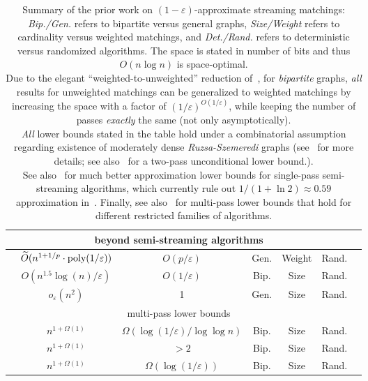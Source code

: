 \documentclass{article}
\newcommand{\Ot}{\widetilde{O}}
\newcommand{\eps}{\varepsilon}
\newcommand{\poly}{\mbox{\rm poly}}
\begin{document}
\begin{table}[h!]
{\begin{tabular}{|c | c | c | c | c | c | c |}
   \hline\hline
  \multicolumn{6}{|c|}{beyond semi-streaming algorithms} \\
  \hline\hline
  \cite{AhnG15} & $\Ot(n^{1+1/p} \cdot \poly{(1/\eps)})$ & $O(p/\eps)$ & Gen. & Weight & Rand. \\
  \hline
  \cite{BehnezhadDETY17} & $O(n^{1.5}\log{\!(n)}/\eps)$ & $O(1/\eps)$ & Bip. & Size & Rand. \\
    \hline
  \cite{AssadiBKL23} & $o_{\eps}(n^2)$ & 1 & Gen. & Size & Rand. \\
   \hline\hline
  \multicolumn{6}{|c|}{multi-pass lower bounds} \\
\hline\hline  
 \cite{ChenKPSSY21} & $n^{1+\Omega(1)}$ & $\Omega({\log{(1/\eps)}}/{\log\log{n}})$ & Bip. & Size & Rand. \\
\hline
\cite{Assadi22} & $n^{1+\Omega(1)}$ & $>2$  & Bip. & Size & Rand. \\
\hline
\cite{AssadiS23} & $n^{1+\Omega(1)}$ & $\Omega(\log{(1/\eps)})$ &Bip. & Size & Rand. \\
\hline
\end{tabular}
}
\caption{\footnotesize Summary of the prior work on $(1-\eps)$-approximate streaming matchings: \emph{Bip./Gen.} refers to bipartite versus general graphs, \emph{Size/Weight} refers to cardinality versus weighted matchings, and \emph{Det./Rand.} refers to deterministic versus randomized algorithms. The space is stated in number of bits and thus $O(n\log{n})$ is space-optimal.\\ 
Due to the elegant ``weighted-to-unweighted'' reduction of~\cite{BernsteinDL21}, for \emph{bipartite} graphs, \emph{all} results for unweighted matchings can be generalized to weighted matchings by increasing the space with a factor of $(1/\eps)^{O(1/\eps)}$, 
while keeping the number of passes \emph{exactly} the same (not only asymptotically). \\ 
\emph{All}  lower bounds stated in the table hold under a combinatorial assumption regarding existence of moderately dense \emph{Ruzsa-Szemeredi} graphs (see~\cite{Assadi22,AssadiS23} for more details; see also~\cite{KonradN24}
for a two-pass unconditional lower bound.). \\
See also~\cite{GoelKK12,Kapralov13,Kapralov21} for much better approximation lower bounds for single-pass semi-streaming algorithms, which currently rule out $1/(1+\ln{2})\approx 0.59$ approximation in~\cite{Kapralov21}. 
Finally, see also~\cite{KhalilK20,KonradN21,KonradNS23} for multi-pass lower bounds that hold for different restricted families of algorithms.
}\label{tab:results}
\end{table} 
\end{document}
